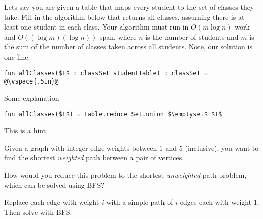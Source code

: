 \begin{problem}[20.][Classes]

Lets say you are given a table that maps every student to the set of
classes they take.  
Fill in the algorithm below that returns all classes,
assuming there is at least one student in each class.  Your algorithm
must run in $O(m \log n)$ work and $O((\log m)(\log n))$ span, where
$n$ is the number of students and $m$ is the sum of the number of
classes taken across all students.    Note, our solution is one line.

\ask[0.5] 

\begin{lstlisting}[numbers=none]
fun allClasses($T$ : classSet studentTable) : classSet = 
@\vspace{.5in}@
\end{lstlisting}

\explain[1.] Some explanation 

\sol[4.]
\begin{lstlisting}[numbers=none]
fun allClasses($T$) = Table.reduce Set.union $\emptyset$ $T$
\end{lstlisting}

\hint[2.] This is a hint

\end{problem}

%

\begin{problem}

Given a graph with integer edge weights between $1$ and $5$
(inclusive), you want to find the shortest \emph{weighted} path
between a pair of vertices. 

\ask
How would you reduce this problem to the
shortest \emph{unweighted} path problem, which can be solved using
BFS?

\sol
Replace each edge with weight $i$ with a simple path of $i$ edges
each with weight $1$. Then solve with BFS.

\end{problem}

